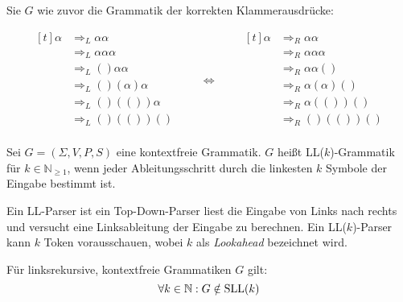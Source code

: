 \begin{beispiel}
    Sie $G$ wie zuvor die Grammatik der korrekten Klammerausdrücke:

    \begin{equation*}
    \begin{aligned}[t]
        \alpha &\Rightarrow_L \alpha \alpha\\
               &\Rightarrow_L \alpha \alpha \alpha\\
               &\Rightarrow_L () \alpha \alpha\\
               &\Rightarrow_L () (\alpha) \alpha\\
               &\Rightarrow_L () (()) \alpha\\
               &\Rightarrow_L () (()) ()\\
    \end{aligned}
    \qquad\Longleftrightarrow\qquad
    \begin{aligned}[t]
        \alpha &\Rightarrow_R \alpha \alpha\\
               &\Rightarrow_R \alpha \alpha \alpha\\
               &\Rightarrow_R \alpha \alpha ()\\
               &\Rightarrow_R \alpha (\alpha) ()\\
               &\Rightarrow_R \alpha (()) ()\\
               &\Rightarrow_R () (()) ()\\
    \end{aligned}
    \end{equation*}
\end{beispiel}

\begin{definition}[LL($k$)-Grammatik]%
    Sei $G = (\Sigma, V, P, S)$ eine kontextfreie Grammatik. $G$ heißt
    LL($k$)-Grammatik für $k \in \mathbb{N}_{\geq 1}$, wenn jeder Ableitungsschritt durch
    die linkesten $k$ Symbole der Eingabe bestimmt ist.
\end{definition}

Ein LL-Parser ist ein Top-Down-Parser liest die Eingabe von Links nach rechts
und versucht eine Linksableitung der Eingabe zu berechnen. Ein LL($k$)-Parser
kann $k$ Token vorausschauen, wobei $k$ als \textit{Lookahead}
bezeichnet wird.

\begin{satz}
    Für linksrekursive, kontextfreie Grammatiken $G$ gilt:
    \[\forall k \in \mathbb{N}: G \notin \operatorname{SLL}(k)\] 
\end{satz}